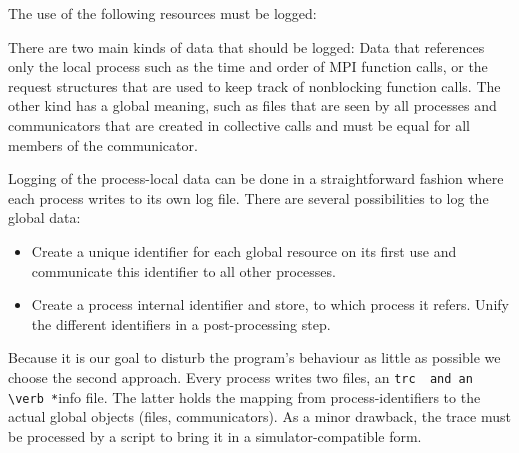 \documentclass[a4paper,12pt,pdftex]{scrartcl}
\begin{document}
The use of the following resources must be logged:

There are two main kinds of data that should be logged: Data that
references only the local process such as the time and order of MPI
function calls, or the request structures that are used to keep track
of nonblocking function calls. The other kind has a global meaning,
such as files that are seen by all processes and communicators that
are created in collective calls and must be equal for all members of
the communicator. 

Logging of the process-local data can be done in a straightforward
fashion where each process writes to its own log file. There are
several possibilities to log the global data:
\begin{itemize}
\item Create a unique identifier for each global resource on its first
  use and communicate this identifier to all other processes. 
\item Create a process internal identifier and store, to which process
  it refers. Unify the different identifiers in a post-processing
  step.
\end{itemize}
Because it is our goal to disturb the program's behaviour as little as
possible we choose the second approach. Every process writes two
files, an \verb *.trc  and an \verb *.info  file. The latter holds the
mapping from process-identifiers to the actual global objects (files,
communicators). As a minor drawback, the trace must be processed by a
script to bring it in a simulator-compatible form. 
\end{document}
